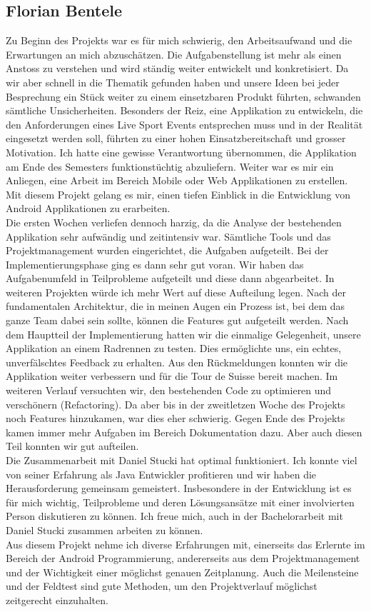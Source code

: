 \subsection{Florian Bentele}
Zu Beginn des Projekts war es für mich schwierig, den Arbeitsaufwand und die Erwartungen an mich abzuschätzen. Die Aufgabenstellung ist mehr als einen Anstoss zu verstehen und wird ständig weiter entwickelt und konkretisiert. Da wir aber schnell in die Thematik gefunden haben und unsere Ideen bei jeder Besprechung ein Stück weiter zu einem einsetzbaren Produkt führten, schwanden sämtliche Unsicherheiten. Besonders der Reiz, eine Applikation zu entwickeln, die den Anforderungen eines Live Sport Events entsprechen muss und in der Realität eingesetzt werden soll, führten zu einer hohen Einsatzbereitschaft und grosser Motivation. Ich hatte eine gewisse Verantwortung übernommen, die Applikation am Ende des Semesters funktionstüchtig abzuliefern. Weiter war es mir ein Anliegen, eine Arbeit im Bereich Mobile oder Web Applikationen zu erstellen. Mit diesem Projekt gelang es mir, einen tiefen Einblick in die Entwicklung von Android Applikationen zu erarbeiten.
\\
Die ersten Wochen verliefen dennoch harzig, da die Analyse der bestehenden Applikation sehr aufwändig und zeitintensiv war. Sämtliche Tools und das Projektmanagement wurden eingerichtet, die Aufgaben aufgeteilt. Bei der Implementierungsphase ging es dann sehr gut voran. Wir haben das Aufgabenumfeld in Teilprobleme aufgeteilt und diese dann abgearbeitet. In weiteren Projekten würde ich mehr Wert auf diese Aufteilung legen. Nach der fundamentalen Architektur, die in meinen Augen ein Prozess ist, bei dem das ganze Team dabei sein sollte, können die Features gut aufgeteilt werden. Nach dem Hauptteil der Implementierung hatten wir die einmalige Gelegenheit, unsere Applikation an einem Radrennen zu testen. Dies ermöglichte uns, ein echtes, unverfälschtes Feedback zu erhalten. Aus den Rückmeldungen konnten wir die Applikation weiter verbessern und für die Tour de Suisse bereit machen.  Im weiteren Verlauf versuchten wir, den bestehenden Code zu optimieren und verschönern (Refactoring). Da aber bis in der zweitletzen Woche des Projekts noch Features hinzukamen, war dies eher schwierig. Gegen Ende des Projekts kamen immer mehr Aufgaben im Bereich Dokumentation dazu. Aber auch diesen Teil konnten wir gut aufteilen.
\\
Die Zusammenarbeit mit Daniel Stucki hat optimal funktioniert. Ich konnte viel von seiner Erfahrung als Java Entwickler profitieren und wir haben die Herausforderung gemeinsam gemeistert. Insbesondere in der Entwicklung ist es für mich wichtig, Teilprobleme und deren Lösungsansätze mit einer involvierten Person diskutieren zu können. Ich freue mich, auch in der Bachelorarbeit mit Daniel Stucki zusammen arbeiten zu können.
\\
Aus diesem Projekt nehme ich diverse Erfahrungen mit, einerseits das Erlernte im Bereich der Android Programmierung, andererseits aus dem Projektmanagement und der Wichtigkeit einer möglichst genauen Zeitplanung. Auch die Meilensteine und der Feldtest sind gute Methoden, um den Projektverlauf möglichst zeitgerecht einzuhalten.


